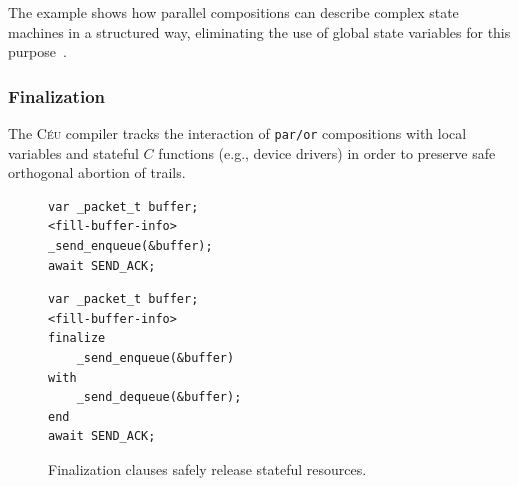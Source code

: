 \documentclass{acm_proc_article-sp}
\newcommand{\CEU}{\textsc{C\'{e}u}\xspace}
\newcommand{\code}[1] {{\small{\texttt{#1}}}}
\newcommand{\1}{\;}
\newcommand{\2}{\;\;}
\newcommand{\3}{\;\;\;}
\newcommand{\5}{\;\;\;\;\;}
\begin{document}
The example shows how parallel compositions can describe complex state machines 
in a structured way, eliminating the use of global state variables for this 
purpose~\cite{ceu.sensys13}.

\subsubsection{Finalization}

%
The \CEU compiler tracks the interaction of \code{par/or} compositions with 
local variables and stateful $C$ functions (e.g., device drivers) in order to 
preserve safe orthogonal abortion of trails.
%

\begin{figure}[t]
\begin{minipage}[t]{0.45\linewidth}
\begin{lstlisting}
var _packet_t buffer;
<fill-buffer-info>
_send_enqueue(&buffer);
await SEND_ACK;
\end{lstlisting}
\end{minipage}
%
\begin{minipage}[t]{0.50\linewidth}
\begin{lstlisting}
var _packet_t buffer;
<fill-buffer-info>
finalize
    _send_enqueue(&buffer)
with
    _send_dequeue(&buffer);
end
await SEND_ACK;
\end{lstlisting}
\end{minipage}
\caption{ Finalization clauses safely release stateful resources.
\label{lst.fin}
}
\end{figure}
\end{document}
